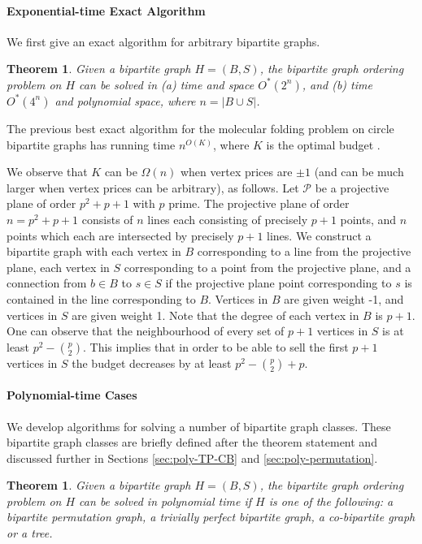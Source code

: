 \documentclass[letterpaper,11pt,abstracton]{scrartcl}
\newtheorem{tm}[theorem]{Theorem}
\begin{document}
\paragraph{Exponential-time Exact Algorithm}
We first give an exact algorithm for arbitrary bipartite graphs.
\begin{tm}\label{thm:exp}
  Given a bipartite graph $H=(B,S)$, the bipartite graph ordering problem on $H$ can be
  solved in (a) time and space $O^*(2^n)$, and (b) time $O^*(4^n)$ and polynomial
  space, where $n=|B\cup S|$.
\end{tm}
The previous best exact algorithm for the molecular folding
problem on circle bipartite graphs has running time $n^{O(K)}$, where $K$ is the optimal budget
\cite{TMRM09}.

We observe that $K$ can be $\Omega(n)$ when vertex prices
are $\pm 1$ (and can be much larger when vertex prices can be arbitrary), as follows.
Let $\mathcal{P}$ be a projective plane of order $p^2+p+1$ with $p$ prime.  The projective plane of order $n=p^2+p+1$ consists of $n$ lines each consisting of
precisely $p+1$ points, and $n$ points which each are intersected by precisely $p+1$
lines.  We construct a bipartite graph with each vertex in $B$ corresponding
to a line from the projective plane, each vertex in $S$ corresponding
to a point from the projective plane, and a connection from $b\in B$ to
$s\in S$ if the projective plane point corresponding to $s$ is contained in
the line corresponding to $B$.  Vertices in $B$ are given weight -1, and
vertices in $S$ are given weight 1.
Note that the degree of each vertex in $B$ is $p+1$. One can observe that the neighbourhood of every set of $p+1$ vertices in $S$ is at
least $p^2- { p \choose 2 }$. This implies
that in order to be able to sell the first $p+1$ vertices in $S$ the budget decreases by at least $p^2- { p \choose 2 }+p$.


\paragraph{Polynomial-time Cases}


We develop algorithms for solving  a number of bipartite graph classes.
These bipartite graph classes are briefly defined after the theorem statement and
discussed further in Sections \ref{sec:poly-TP-CB} and \ref{sec:poly-permutation}.

\begin{tm}\label{thm:main}
  Given a bipartite graph $H=(B,S)$, the bipartite graph ordering problem on $H$ can be
  solved in polynomial time if $H$ is one of the following:
  a bipartite permutation graph, a trivially perfect bipartite graph, a co-bipartite graph or a tree.
\end{tm}
\end{document}
